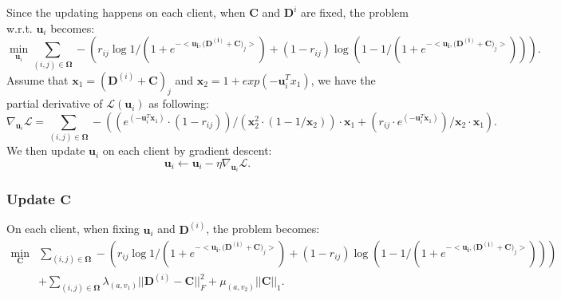 \documentclass{article} %
\begin{document}
Since the updating happens on each client, when $\mathbf{C}$ and $\mathbf{D}^{i}$ are fixed, the problem w.r.t. $\mathbf{u}_i$ becomes:
\begin{equation}
    \min_{\mathbf{u}_i} 
    \sum_{(i, j) \in \mathbf{\Omega}} - (
        r_{ij}\log 1/(1+e^{-<\mathbf{\mathbf{u}_i, (\mathbf{D}^{(i)} + \mathbf{C}})_j>}) + 
        (1-r_{ij})  \log (1-1/(1+e^{-<\mathbf{\mathbf{u}_i, (\mathbf{D}^{(i)} + \mathbf{C}})_j>}))
    ).
    \label{eq:obj_wrt_u}
\end{equation}
Assume that $\mathbf{x}_1 = (\mathbf{D}^{(i)} + \mathbf{C})_j$ and $\mathbf{x}_2=1+exp(-\mathbf{u}_i^T x_1)$,
we have the partial derivative of $\mathcal{L}(\mathbf{u}_i)$ as following:
\begin{equation}
    \nabla_{\mathbf{u}_i} \mathcal{L} = 
    \sum_{(i, j) \in \mathbf{\Omega}}
    -((e^{(-\mathbf{u}_i^T \mathbf{x}_1)} \cdot(1-r_{ij})) /(\mathbf{x}_2^{2} \cdot (1-1 / \mathbf{x}_2)) \cdot \mathbf{x}_1+(r_{ij} \cdot e^{(-\mathbf{u}_i^T \mathbf{x}_1)}) / \mathbf{x}_2 \cdot \mathbf{x}_1).
\end{equation}
We then update $\mathbf{u}_i$ on each client by gradient descent:
\begin{equation}
    \mathbf{u}_i \leftarrow \mathbf{u}_i - \eta \nabla_{\mathbf{u}_i} \mathcal{L}.
\end{equation}

\subsubsection{Update $\mathbf{C}$}

On each client, when fixing $\mathbf{u}_{i}$ and $\mathbf{D}^{(i)}$, the problem becomes:
\begin{equation}
    \begin{aligned}
    \min_{\mathbf{C}} 
        & \sum_{(i, j) \in \mathbf{\Omega}} - (
            r_{ij}\log 1/(1+e^{-<\mathbf{\mathbf{u}_i, (\mathbf{D}^{(i)} + \mathbf{C}})_j>}) + 
            (1-r_{ij})  \log (1-1/(1+e^{-<\mathbf{\mathbf{u}_i, (\mathbf{D}^{(i)} + \mathbf{C}})_j>}))
        ) \\
        & +\sum_{(i, j) \in \mathbf{\Omega}} \lambda_{(a, v_1)} ||\mathbf{D}^{(i)} - \mathbf{C}||^2_F
        + \mu_{(a, v_2)} ||\mathbf{C}||_1.
    \end{aligned}
    \label{eq:obj_wrt_c}
\end{equation}
\end{document}
